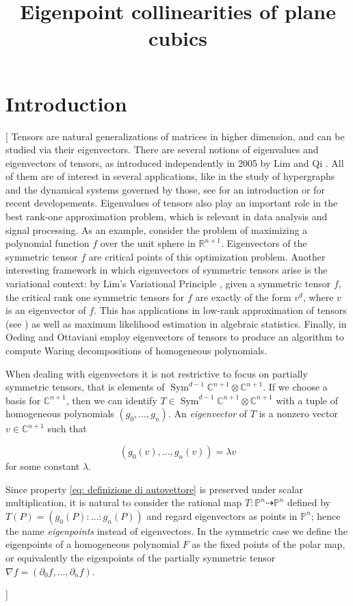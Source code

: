 \documentclass{amsart}
\title{Eigenpoint collinearities of plane cubics}
\author{}
\date{}
\theoremstyle{plain}
\theoremstyle{definition}
\newcommand{\R}{\mathbb{R}}
\newcommand{\C}{\mathbb{C}}
\newcommand{\p}{\mathbb{P}}
\newcommand{\de}{\partial}
\newcommand{\Sym}{\operatorname{Sym}}
\newcommand{\blue}[1]{{\color{blue}  [#1]}}
\begin{document}
\maketitle

\section{Introduction}
\label{introduction}
\blue{
Tensors are natural generalizations of matrices in higher dimension, and can be studied via their eigenvectors. There are several notions of eigenvalues and eigenvectors of tensors, as introduced independently in 2005 by Lim \cite{Lim} and Qi \cite{Qi}. All of them are of interest in several applications, like in the study of hypergraphs and the dynamical systems governed by those, see \cite[Section 4]{QZ} for an introduction or \cite{GMV} for recent developements. Eigenvalues of tensors also play an important role in the best rank-one approximation problem, which is relevant in data analysis and signal processing.
As an example, consider the problem of maximizing a polynomial function $f$ over the unit sphere in $\R^{n+1}$. Eigenvectors of the symmetric tensor $f$ are critical points of this optimization problem. Another interesting framework in which eigenvectors of symmetric tensors arise is the variational context: by Lim's Variational Principle \cite{Lim}, given a symmetric tensor $f$, the critical rank one symmetric tensors for $f$ are exactly of the form $v^d$, where $v$ is an eigenvector of $f$.
This has applications in low-rank approximation of tensors (see \cite{OttSod}) as well as maximum likelihood estimation in algebraic statistics. Finally, in \cite{OO} Oeding and Ottaviani employ eigenvectors of tensors to produce an algorithm to compute Waring decompositions of homogeneous polynomials.

When dealing with eigenvectors it is not restrictive to focus on partially symmetric tensors, that is elements of $\Sym^{d-1}\C^{n+1}\otimes\C^{n+1}$.
 If we choose a basis for $\C^{n+1}$, then we can identify $T\in \Sym^{d-1}\C^{n+1}\otimes\C^{n+1}$ with a tuple of homogeneous polynomials $(g_0,\dots,g_n)$. An \emph{eigenvector} of $T$ is a nonzero vector $v\in\C^{n+1}$ such that

\begin{equation}\label{eq: definizione di autovettore}
(g_0(v), \ldots, g_n(v))=\lambda v
\end{equation}
for some constant $\lambda$.


Since %
property \eqref{eq: definizione di autovettore} is preserved under scalar multiplication, it is natural to consider the rational map $T:\p^n\dashrightarrow\p^n$ defined by $T(P)=(g_0(P):\ldots:g_n(P))$ and regard eigenvectors as points in $\p^n$; hence the name \emph{eigenpoints} instead of eigenvectors. In the symmetric case we define the eigenpoints of a homogeneous polynomial $F$ as the fixed points of the polar map, or equivalently the eigenpoints of the partially symmetric tensor $\nabla f =(\de_0f,\dots,\de_n f)$.

}
\end{document}
